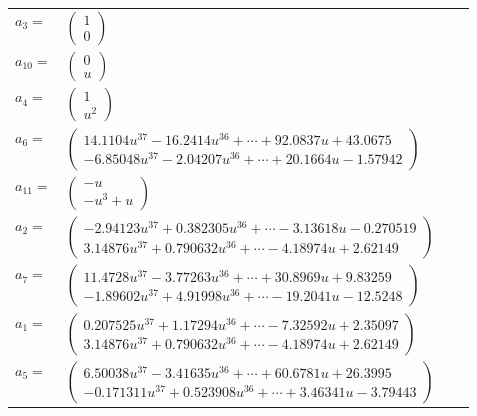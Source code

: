 \documentclass[1p]{elsarticle_modified}
\theoremstyle{definition}
\begin{document}
\begin{tabular}{m{7pt} m{180pt} m{7pt} m{180pt} }
\flushright $a_{3}=$&$\begin{pmatrix}1\\0\end{pmatrix}$ \\
\flushright $a_{10}=$&$\begin{pmatrix}0\\u\end{pmatrix}$ \\
\flushright $a_{4}=$&$\begin{pmatrix}1\\u^2\end{pmatrix}$ \\
\flushright $a_{6}=$&$\begin{pmatrix}14.1104 u^{37}-16.2414 u^{36}+\cdots+92.0837 u+43.0675\\-6.85048 u^{37}-2.04207 u^{36}+\cdots+20.1664 u-1.57942\end{pmatrix}$ \\
\flushright $a_{11}=$&$\begin{pmatrix}- u\\- u^3+u\end{pmatrix}$ \\
\flushright $a_{2}=$&$\begin{pmatrix}-2.94123 u^{37}+0.382305 u^{36}+\cdots-3.13618 u-0.270519\\3.14876 u^{37}+0.790632 u^{36}+\cdots-4.18974 u+2.62149\end{pmatrix}$ \\
\flushright $a_{7}=$&$\begin{pmatrix}11.4728 u^{37}-3.77263 u^{36}+\cdots+30.8969 u+9.83259\\-1.89602 u^{37}+4.91998 u^{36}+\cdots-19.2041 u-12.5248\end{pmatrix}$ \\
\flushright $a_{1}=$&$\begin{pmatrix}0.207525 u^{37}+1.17294 u^{36}+\cdots-7.32592 u+2.35097\\3.14876 u^{37}+0.790632 u^{36}+\cdots-4.18974 u+2.62149\end{pmatrix}$ \\
\flushright $a_{5}=$&$\begin{pmatrix}6.50038 u^{37}-3.41635 u^{36}+\cdots+60.6781 u+26.3995\\-0.171311 u^{37}+0.523908 u^{36}+\cdots+3.46341 u-3.79443\end{pmatrix}$ \\

\end{tabular}
\end{document}
